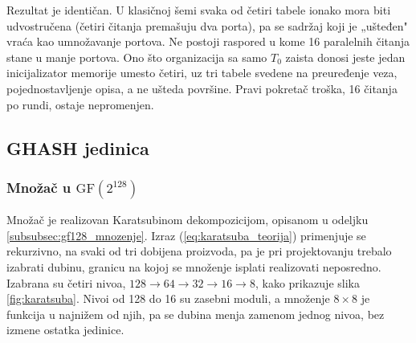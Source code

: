 \begin{table}[H]
\caption{Broj kopija memorijskog bloka po rundi za dve organizacije T-tabela}
\centering
{}
\label{tab:bram_kopije}
\end{table}

Rezultat je identičan. U klasičnoj šemi svaka od četiri tabele ionako mora biti udvostručena (četiri čitanja premašuju dva porta), pa se sadržaj koji je „ušteđen" vraća kao umnožavanje portova. Ne postoji raspored u kome 16 paralelnih čitanja stane u manje portova. Ono što organizacija sa samo $T_0$ zaista donosi jeste jedan inicijalizator memorije umesto četiri, uz tri tabele svedene na preuređenje veza, pojednostavljenje opisa, a ne ušteda površine. Pravi pokretač troška, 16 čitanja po rundi, ostaje nepromenjen.

\subsection{GHASH jedinica}
\label{subsec:hw_ghash}

\subsubsection{Množač u \texorpdfstring{$\mathrm{GF}(2^{128})$}{GF(2\^{}128)}}

Množač je realizovan Karatsubinom dekompozicijom, opisanom u odeljku \ref{subsubsec:gf128_mnozenje}. Izraz (\ref{eq:karatsuba_teorija}) primenjuje se rekurzivno, na svaki od tri dobijena proizvoda, pa je pri projektovanju trebalo izabrati dubinu, granicu na kojoj se množenje isplati realizovati neposredno. Izabrana su četiri nivoa, $128 \to 64 \to 32 \to 16 \to 8$, kako prikazuje slika \ref{fig:karatsuba}. Nivoi od 128 do 16 su zasebni moduli, a množenje $8 \times 8$ je funkcija u najnižem od njih, pa se dubina menja zamenom jednog nivoa, bez izmene ostatka jedinice.

